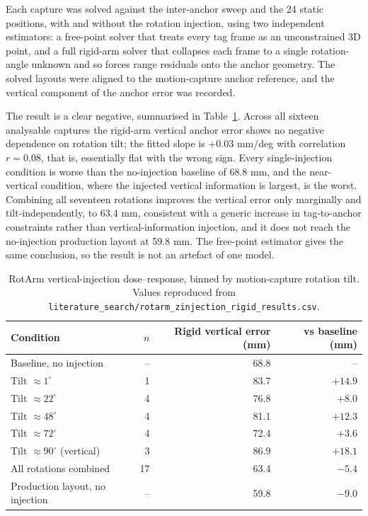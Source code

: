 \documentclass[11pt,a4paper]{article}
\begin{document}
Each capture was solved against the inter-anchor sweep and the 24 static positions, with and without the rotation injection, using two independent estimators: a free-point solver that treats every tag frame as an unconstrained 3D point, and a full rigid-arm solver that collapses each frame to a single rotation-angle unknown and so forces range residuals onto the anchor geometry. The solved layouts were aligned to the motion-capture anchor reference, and the vertical component of the anchor error was recorded.

The result is a clear negative, summarised in Table~\ref{tab:rotarm}. Across all sixteen analysable captures the rigid-arm vertical anchor error shows no negative dependence on rotation tilt; the fitted slope is $+0.03$ mm/deg with correlation $r=0.08$, that is, essentially flat with the wrong sign. Every single-injection condition is worse than the no-injection baseline of 68.8 mm, and the near-vertical condition, where the injected vertical information is largest, is the worst. Combining all seventeen rotations improves the vertical error only marginally and tilt-independently, to 63.4 mm, consistent with a generic increase in tag-to-anchor constraints rather than vertical-information injection, and it does not reach the no-injection production layout at 59.8 mm. The free-point estimator gives the same conclusion, so the result is not an artefact of one model.

\begin{table}[H]
\centering
\caption{RotArm vertical-injection dose--response, binned by motion-capture rotation tilt. Values reproduced from \texttt{literature\_search/rotarm\_zinjection\_rigid\_results.csv}.}
\label{tab:rotarm}
\begin{tabular}{@{}lrrr@{}}
\toprule
Condition & $n$ & Rigid vertical error (mm) & vs baseline (mm) \\
\midrule
Baseline, no injection & -- & 68.8 & -- \\
Tilt $\approx 1^\circ$ & 1 & 83.7 & $+14.9$ \\
Tilt $\approx 22^\circ$ & 4 & 76.8 & $+8.0$ \\
Tilt $\approx 48^\circ$ & 4 & 81.1 & $+12.3$ \\
Tilt $\approx 72^\circ$ & 4 & 72.4 & $+3.6$ \\
Tilt $\approx 90^\circ$ (vertical) & 3 & 86.9 & $+18.1$ \\
All rotations combined & 17 & 63.4 & $-5.4$ \\
Production layout, no injection & -- & 59.8 & $-9.0$ \\
\bottomrule
\end{tabular}
\end{table}
\end{document}
